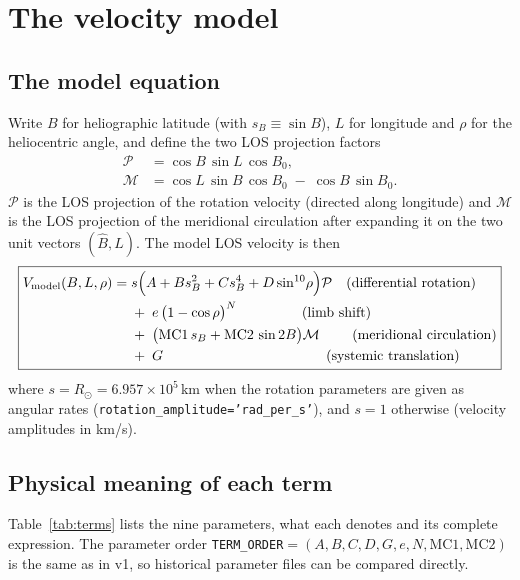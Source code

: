 \documentclass[11pt,a4paper]{article}
\newcommand{\code}[1]{\texttt{\small #1}}
\newcommand{\Rsun}{R_{\odot}}
\newcommand{\Proj}{\mathcal{P}}
\newcommand{\Merid}{\mathcal{M}}
\begin{document}
\section{The velocity model}
\label{sec:model}

\subsection{The model equation}
Write $B$ for heliographic latitude (with $s_B \equiv \sin B$), $L$ for
longitude and $\rho$ for the heliocentric angle, and define the two LOS
projection factors
\begin{align}
  \Proj  &= \cos B \,\sin L \,\cos B_0, \label{eq:proj-rot}\\
  \Merid &= \cos L \,\sin B \,\cos B_0 \;-\; \cos B \,\sin B_0 . \label{eq:proj-mer}
\end{align}
$\Proj$ is the LOS projection of the rotation velocity (directed along
longitude) and $\Merid$ is the LOS projection of the meridional circulation
after expanding it on the two unit vectors $(\hat B, \hat L)$.  The model LOS
velocity is then
\begin{equation}
\boxed{
\begin{aligned}
V_{\mathrm{model}}(B,L,\rho) =\;&
  s\Bigl(A + B s_B^{2} + C s_B^{4} + D \sin^{10}\!\rho\Bigr)\Proj
  \quad\text{(differential rotation)}\\
 &+\; e\,\bigl(1-\cos\rho\bigr)^{N} \qquad\qquad\ \ \text{(limb shift)}\\
 &+\; \bigl(\mathrm{MC1}\,s_B + \mathrm{MC2}\,\sin 2B\bigr)\Merid
  \qquad\ \text{(meridional circulation)}\\
 &+\; G \qquad\qquad\qquad\qquad\qquad\quad\ \ \text{(systemic translation)}
\end{aligned}}
\label{eq:model}
\end{equation}
where $s = \Rsun = 6.957\times10^{5}$\,km when the rotation parameters are given
as angular rates (\code{rotation\_amplitude='rad\_per\_s'}), and $s = 1$
otherwise (velocity amplitudes in km/s).

\subsection{Physical meaning of each term}
Table~\ref{tab:terms} lists the nine parameters, what each denotes and its
complete expression.  The parameter order
\code{TERM\_ORDER}${}=(A,B,C,D,G,e,N,\mathrm{MC1},\mathrm{MC2})$ is the same as
in v1, so historical parameter files can be compared directly.
\end{document}
